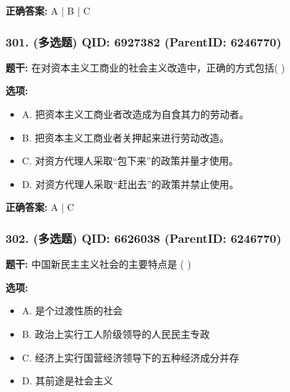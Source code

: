 \documentclass[12pt,UTF8]{ctexart}
\begin{document}
\textbf{正确答案:}
A | B | C

\vspace{0.3em}\hrulefill\vspace{0.7em}

\subsubsection*{301. (多选题) \small QID: 6927382 (ParentID: 6246770)}

\textbf{题干:}
在对资本主义工商业的社会主义改造中，正确的方式包括(      )



\textbf{选项:}
\begin{itemize}[leftmargin=*]

  \item A. 把资本主义工商业者改造成为自食其力的劳动者。

  \item B. 把资本主义工商业者关押起来进行劳动改造。

  \item C. 对资方代理人采取“包下来”的政策并量才使用。

  \item D. 对资方代理人采取“赶出去”的政策并禁止使用。

\end{itemize}

\textbf{正确答案:}
A | C

\vspace{0.3em}\hrulefill\vspace{0.7em}

\subsubsection*{302. (多选题) \small QID: 6626038 (ParentID: 6246770)}

\textbf{题干:}
中国新民主主义社会的主要特点是  ( )



\textbf{选项:}
\begin{itemize}[leftmargin=*]

  \item A. 是个过渡性质的社会

  \item B. 政治上实行工人阶级领导的人民民主专政

  \item C. 经济上实行国营经济领导下的五种经济成分并存

  \item D. 其前途是社会主义

\end{itemize}
\end{document}
